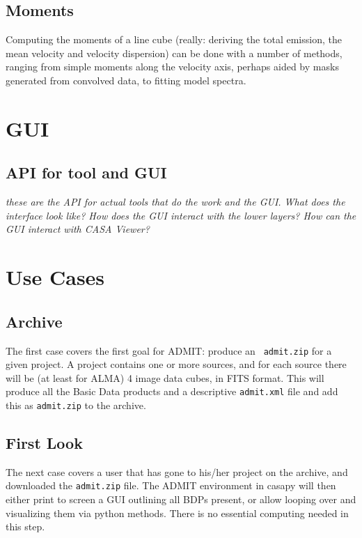 \documentclass{article}
\begin{document}
\subsection{Moments}

Computing the moments of a line cube (really: deriving the total
emission, the mean velocity and velocity dispersion) can be done
with a number of methods, ranging from simple moments along the
velocity axis, perhaps aided by masks generated from convolved
data, to fitting model spectra.

\section{GUI}


\subsection{API for tool and GUI}

{\it these are the API for actual tools that do the
work and the GUI. What does the interface look like?
How does the GUI interact with the lower layers? How
can the GUI interact with CASA Viewer?}

\section{Use Cases}

\subsection{Archive}

The first case covers the first goal for ADMIT: produce an {\tt
  admit.zip} for a given project.  A project contains one or more
sources, and for each source there will be (at least for ALMA) 4 image
data cubes, in FITS format. This will produce all the Basic Data
products and a descriptive {\tt admit.xml} file and add this as 
{\tt admit.zip} to the archive.



\subsection{First Look}

The next case covers a user that has gone to his/her project on the archive,
and downloaded the {\tt admit.zip} file. The ADMIT environment in casapy
will then either print to screen a GUI outlining all BDPs present, or
allow looping over and visualizing them via python methods. There is no
essential computing needed in this step.
\end{document}
